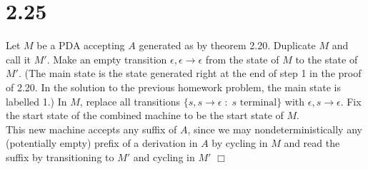 \documentclass{article}
\begin{document}


\section*{2.25}
Let $M$ be a PDA accepting $A$ generated as by theorem 2.20. Duplicate $M$ and call it $M'$. Make an empty transition $\epsilon,\epsilon\to\epsilon$ from the  state of $M$ to the  state of $M'$. (The main state is the state generated right at the end of step 1 in the proof of 2.20. In the solution to the previous homework problem, the main state is labelled 1.) In $M$, replace all transitions $\{s,s \to \epsilon \;:\; s \text{ terminal}\}$ with $\epsilon,s \to \epsilon$. Fix the start state of the combined machine to be the start state of $M$.\\
This new machine accepts any suffix of $A$, since we may nondeterministically  any (potentially empty) prefix of a derivation in $A$ by cycling in $M$ and read the suffix by transitioning to $M'$ and cycling in $M'$ $\Box$
\end{document}
